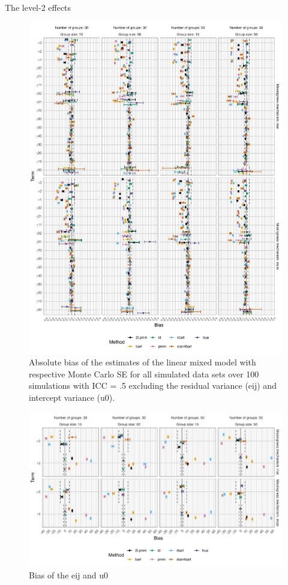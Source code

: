 \documentclass[10pt, a4paper, titlepage]{article}
\begin{document}
The level-2 effects 

\begin{figure}[H]
    \centering
    \includegraphics[width=1\textwidth]{bias1.png}
    \caption{Absolute bias of the estimates  of the linear mixed model with respective Monte Carlo SE for all simulated data sets over 100 simulations with ICC = .5 excluding the residual variance (eij) and intercept variance (u0).}
    \label{fig:bias1}
\end{figure}

\begin{figure}[H]
    \centering
    \includegraphics[width=1\textwidth]{bias2.png}
    \caption{Bias of the eij and u0}
    \label{fig:bias2}
\end{figure}
\end{document}

